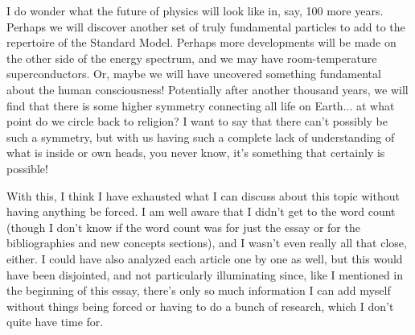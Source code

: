 I do wonder what the future of physics will look like in, say, 100 more years. Perhaps we will discover another set of truly fundamental particles to add to the repertoire of the Standard Model. Perhaps more developments will be made on the other side of the energy spectrum, and we may have room-temperature superconductors. Or, maybe we will have uncovered something fundamental about the human consciousness! Potentially after another thousand years, we will find that there is some higher symmetry connecting all life on Earth... at what point do we circle back to religion? I want to say that there can't possibly be such a symmetry, but with us having such a complete lack of understanding of what is inside or own heads, you never know, it's something that certainly is possible!

With this, I think I have exhausted what I can discuss about this topic without having anything be forced. I am well aware that I didn't get to the word count (though I don't know if the word count was for just the essay or for the bibliographies and new concepts sections), and I wasn't even really all that close, either. I could have also analyzed each article one by one as well, but this would have been disjointed, and not particularly illuminating since, like I mentioned in the beginning of this essay, there's only so much information I can add myself without things being forced or having to do a bunch of research, which I don't quite have time for.



